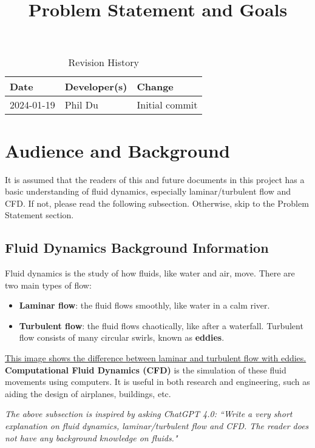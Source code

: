 \documentclass{article}
\title{Problem Statement and Goals\\\progname}
\author{\authname}
\date{}
\begin{document}
\maketitle

\begin{table}[hp]
\caption{Revision History} \label{TblRevisionHistory}
\begin{tabularx}{\textwidth}{llX}
\toprule
\textbf{Date} & \textbf{Developer(s)} & \textbf{Change}\\
\midrule
2024-01-19 & Phil Du & Initial commit\\

\bottomrule
\end{tabularx}
\end{table}

\section{Audience and Background}
It is assumed that the readers of this and future documents in this project has a basic understanding of fluid dynamics, especially laminar/turbulent flow and CFD. If not, please read the following subsection. Otherwise, skip to the Problem Statement section.

\subsection{Fluid Dynamics Background Information}

Fluid dynamics is the study of how fluids, like water and air, move. There are two main types of flow:
\begin{itemize}
    \item \textbf{Laminar flow}: the fluid flows smoothly, like water in a calm river.
    \item \textbf{Turbulent flow}: the fluid flows chaotically, like after a waterfall. Turbulent flow consists of many circular swirls, known as \textbf{eddies}.
\end{itemize}
\href{https://www.jousefmurad.com/content/images/size/w1000/2022/11/laminar_turbulent_flow.jpeg}{This image shows the difference between laminar and turbulent flow with eddies.}
\textbf{Computational Fluid Dynamics (CFD)} is the simulation of these fluid movements using computers. It is useful in both research and engineering, such as aiding the design of airplanes, buildings, etc. 

\textit{The above subsection is inspired by asking ChatGPT 4.0: ``Write a very short explanation on fluid dynamics, laminar/turbulent flow and CFD. The reader does not have any background knowledge on fluids."}
\end{document}
